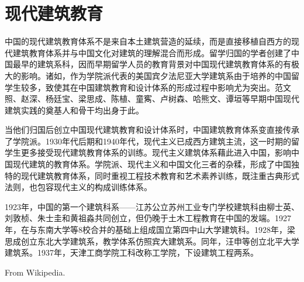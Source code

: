 \documentclass{article}
\begin{document}
\section{现代建筑教育}

中国的现代建筑教育体系不是来自本土建筑营造的延续，而是直接移植自西方的现代建筑教育体系并与中国文化对建筑的理解混合而形成。留学归国的学者创建了中国最早的建筑系科，因而早期留学人员的教育背景对中国现代建筑教育体系的有极大的影响。诸如，作为学院派代表的美国宾夕法尼亚大学建筑系由于培养的中国留学生较多，致使其在中国建筑教育和设计体系的形成过程中影响尤为突出。范文照、赵深、杨廷宝、梁思成、陈植、童寯、卢树森、哈熊文、谭垣等早期中国现代建筑实践的奠基人和骨干均出身于此。

当他们归国后创立中国现代建筑教育和设计体系时，中国建筑教育体系变直接传承了学院派。1930年代后期和1940年代，现代主义已成西方建筑主流，这一时期的留学生更多接受现代建筑教育体系的训练。现代主义建筑体系藉此进入中国，影响中国现代建筑的教育体系。学院派、现代主义和中国文化三者的杂糅，形成了中国独特的现代建筑教育体系，同时重视工程技术教育和艺术素养训练，既注重古典形式法则，也包容现代主义的构成训练体系。

1923年，中国的第一个建筑科系——江苏公立苏州工业专门学校建筑科由柳士英、刘敦桢、朱士圭和黄祖淼共同创立，但仍晚于土木工程教育在中国的发端。1927年，在与东南大学等8校合并的基础上组成国立第四中山大学建筑科。1928年，梁思成创立东北大学建筑系，教学体系仿照宾大建筑系。同年，汪申等创立北平大学建筑系。1937年，天津工商学院工科改称工学院，下设建筑工程两系。

\medskip

From Wikipedia.
\end{document}
